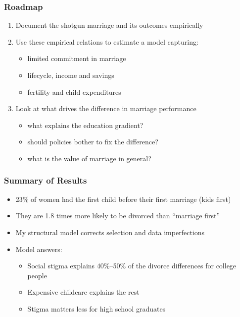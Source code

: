 \documentclass[aspectratio=169]{beamer}
\let\olditem\item
\renewcommand{\item}{%
\olditem\vspace{\fill}}
\begin{document}
\begin{frame}
\frametitle{Roadmap}
\begin{enumerate}
\item Document the shotgun marriage and its outcomes empirically
\item Use these empirical relations to estimate a model capturing:
\begin{itemize}
\item limited commitment in marriage
\item lifecycle, income and savings
\item fertility and child expenditures
\end{itemize}
\item Look at what drives the difference in marriage performance
\begin{itemize}
\item what explains the education gradient?
\item should policies bother to fix the difference?
\item what is the value of marriage in general?
\end{itemize}
\end{enumerate}
\end{frame}

\begin{frame}
\frametitle{Summary of Results}
\begin{itemize}
\item 23\% of women had the first child before their first marriage (kids first)
\item They are 1.8 times more likely to be divorced than ``marriage first''
\item My structural model corrects selection and data imperfections
\item Model answers:
\begin{itemize}
\item Social stigma explains 40\%--50\% of the divorce differences for college people
\item Expensive childcare explains the rest
\item Stigma matters less for high school graduates
\end{itemize}
\end{itemize}
\end{frame}
\end{document}
